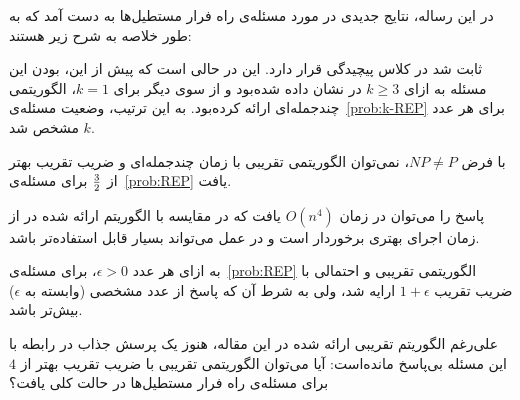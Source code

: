 

در این رساله، نتایج جدیدی در مورد مسئله‌ی راه فرار مستطیل‌ها به دست آمد که به طور خلاصه به شرح زیر هستند:


 ثابت شد  در کلاس پیچیدگی  قرار دارد. این در حالی است که پیش از این،  بودن این مسئله به ازای $k \geq 3$ در \cite{REP} نشان داده شده‌بود و از سوی دیگر برای $k = 1$، \cite{BoundaryRec} الگوریتمی چند‌جمله‌ای ارائه کرده‌بود. به این ترتیب، وضعیت مسئله‌ی~\ref{prob:k-REP} برای هر عدد $k$ مشخص شد.

 با فرض $NP \neq P$، نمی‌توان الگوریتمی تقریبی با زمان چند‌جمله‌ای و ضریب تقریب بهتر از ${3} \over {2}$ برای مسئله‌ی~\ref{prob:REP} یافت.

 پاسخ  را می‌توان در زمان $O(n ^ 4)$ یافت که در مقایسه با الگوریتم ارائه شده در \cite{BoundaryRec} از زمان اجرای بهتری برخوردار است و در عمل می‌تواند بسیار قابل استفاده‌تر باشد.

 به ازای هر عدد $\epsilon > 0$، برای مسئله‌ی~\ref{prob:REP} الگوریتمی تقریبی و احتمالی با ضریب تقریب $1 + \epsilon$ ارایه شد، ولی به شرط آن که پاسخ از عدد مشخصی (وابسته به $\epsilon$) بیش‌تر باشد.


علی‌رغم الگوریتم تقریبی ارائه شده در این مقاله، هنوز یک پرسش جذاب در رابطه با این مسئله بی‌پاسخ مانده‌است: آیا می‌توان الگوریتمی تقریبی با ضریب تقریب بهتر از $4$ برای مسئله‌ی راه فرار مستطیل‌ها در حالت کلی یافت؟
